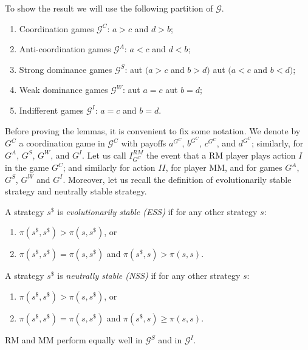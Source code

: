 \documentclass[fleqn,reqno,11pt]{article}
\begin{document}
\noindent To show
the result we will use the following partition of $\mathcal{G}$.
\begin{enumerate}
\item Coordination games $\mathcal{G}^{C}$: $a>c$ and $d>b$;
\item Anti-coordination games $\mathcal{G}^{A}$: $a<c$ and $d<b$;
\item Strong dominance games $\mathcal{G}^{S}$: aut $(a>c$ and $b>d)$
aut $(a<c$ and $b<d)$;
\item Weak dominance games $\mathcal{G}^{W}$: aut $a=c$ aut $b=d$;
\item Indifferent games $\mathcal{G}^{I}$: $a=c$ and $b=d$.
\end{enumerate}
Before proving the lemmas, it is convenient to fix some notation.
We denote by $G^{C}$ a coordination game in $\mathcal{G}^{C}$ with
payoffs $a^{G^{C}}$, $b^{G^{C}}$, $c^{G^{C}}$, and $d^{G^{C}}$;
similarly, for $G^{A}$, $G^{S}$, $G^{W}$, and $G^{I}$. Let us
call $I_{G^{C}}^{RM}$ the event that a RM player plays action $I$
in the game $G^{C}$; and similarly for action $II$, for player MM,
and for games $G^{A}$, $G^{S}$, $G^{W}$ and $G^{I}$. Moreover,
let us recall the definition of evolutionarily stable strategy and
neutrally stable strategy.

\medskip{}

\begin{definition}
A strategy $s^{\$}$ is \emph{evolutionarily stable
(ESS)} if for any other strategy $s$:
\begin{enumerate}
\item $\pi(s^{\$},s^{\$})>\pi(s,s^{\$})$, or
\item $\pi(s^{\$},s^{\$})=\pi(s,s^{\$})$ and $\pi(s^{\$},s)>\pi(s,s)$.
\end{enumerate}
\noindent A strategy $s^{\$}$ is \emph{neutrally stable (NSS)} if
for any other strategy $s$:
\begin{enumerate}
\item $\pi(s^{\$},s^{\$})>\pi(s,s^{\$})$, or
\item $\pi(s^{\$},s^{\$})=\pi(s,s^{\$})$ and $\pi(s^{\$},s)\geq\pi(s,s)$.
\end{enumerate}
\end{definition}

\medskip{}

\begin{lemma}
RM and MM perform equally well in $\mathcal{G}^{S}$
and in $\mathcal{G}^{I}$. 
\end{lemma}
\end{document}
